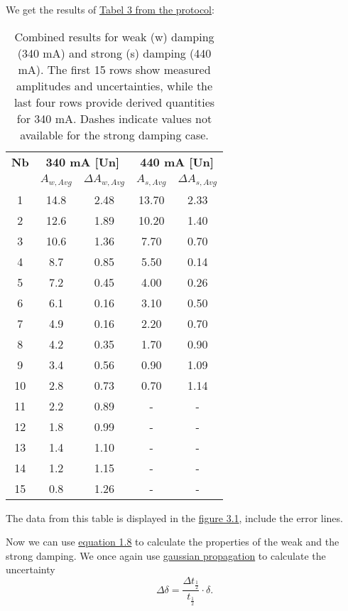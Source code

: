 \newpage
We get the results of \hyperref[protocol]{Tabel 3 from the protocol}:

\begin{table}[h!]
    \centering
    \begin{tabular}{c | c c | c c}
        \toprule
        \textbf{Nb} & \multicolumn{2}{c|}{\textbf{340 mA [Un]}} & \multicolumn{2}{c}{\textbf{440 mA [Un]}} \\
        & $A_{w,Avg}$ & $\Delta A_{w,Avg}$ & $A_{s,Avg}$ & $\Delta A_{s,Avg}$ \\
        \midrule
        1  & 14.8 & 2.48 & 13.70 & 2.33 \\
        2  & 12.6 & 1.89 & 10.20 & 1.40 \\
        3  & 10.6 & 1.36 & 7.70  & 0.70 \\
        4  & 8.7  & 0.85 & 5.50  & 0.14 \\
        5  & 7.2  & 0.45 & 4.00  & 0.26 \\
        6  & 6.1  & 0.16 & 3.10  & 0.50 \\
        7  & 4.9  & 0.16 & 2.20  & 0.70 \\
        8  & 4.2  & 0.35 & 1.70  & 0.90 \\
        9  & 3.4  & 0.56 & 0.90  & 1.09 \\
        10 & 2.8  & 0.73 & 0.70  & 1.14 \\
        11 & 2.2  & 0.89 & -     & -    \\
        12 & 1.8  & 0.99 & -     & -    \\
        13 & 1.4  & 1.10 & -     & -    \\
        14 & 1.2  & 1.15 & -     & -    \\
        15 & 0.8  & 1.26 & -     & -    \\
        \bottomrule
    \end{tabular}
    \caption{Combined results for weak (w) damping (340 mA) and strong (s) damping (440 mA). The first 15 rows show measured amplitudes and uncertainties, while the last four rows provide derived quantities for 340 mA. Dashes indicate values not available for the strong damping case.}
    \label{tab:combined_updated}
\end{table}



The data from this table is displayed in the \hyperref[fig:dumping_on_log]{figure 3.1}, include the error lines.

Now we can use \hyperref[eq:damping_halftime]{equation 1.8} to calculate the properties of the weak and the strong damping.
We once again use \hyperref[eq:gauss_fehlfortpflanzung]{gaussian propagation} to calculate the uncertainty
\begin{equation}
    \Delta \delta = \frac{\Delta t_{\frac{1}{2}}}{t_{\frac{1}{2}}} \cdot \delta.
\end{equation}

